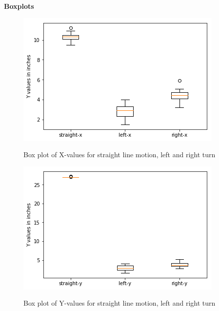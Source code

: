 \documentclass[11pt,a4paper,titlepage]{article}
\begin{document}
\textbf{Boxplots}
\begin{figure}[H]
	\centering	
		\includegraphics[width=1.0\linewidth]{boxplot-x}
		\label{fig:sub1}
	\caption{\color{blue}Box plot of X-values for straight line motion, left and right turn}
\end{figure}
\begin{figure}[H]
	\centering	
		\includegraphics[width=1.0\linewidth]{boxplot-y}
		\label{fig:sub1}
	\caption{\color{blue}Box plot of Y-values for straight line motion, left and right turn}
\end{figure}
\end{document}
